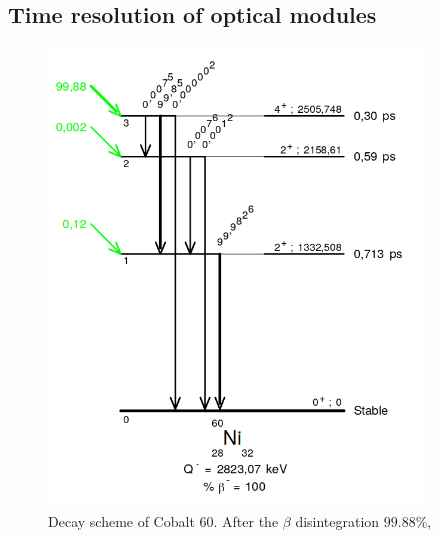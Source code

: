 \subsection{Time resolution of optical modules}

\begin{figure}
  \centering
  \includegraphics[width=10cm]{commissioning/fig_commissioning/Co_decay_scheme.png}

  \caption{Decay scheme of Cobalt $60$.
    After the $\beta$ disintegration $99.88$\%,
  \label{fig:Co_decay_scheme}}
\end{figure}




